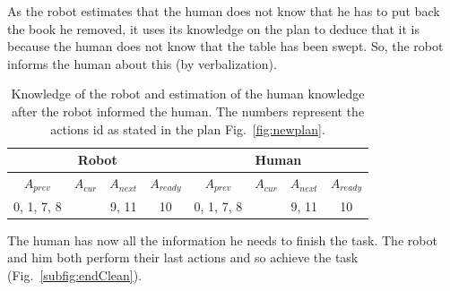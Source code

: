 \documentclass[english,a4paper,11pt,twoside]{StyleThese}
\begin{document}
As the robot estimates that the human does not know that he has to put back the book he removed, it uses its knowledge on the plan to deduce that it is because the human does not know that the table has been swept. So, the robot informs the human about this (by verbalization). 

\begin{table}[!h]
\begin{center}
\begin{tabular}{|c|c|c|c||c|c|c|c|}
\hline
\multicolumn{4}{|c||}{Robot} & \multicolumn{4}{c|}{Human}\\
\hline
$A_{prev}$ & $A_{cur}$ & $A_{next}$ & $A_{ready}$ & $A_{prev}$ & $A_{cur}$ & $A_{next}$ & $A_{ready}$\\
\hline
\hline
0, 1, 7, 8  &  & 9, 11 & 10 & 0, 1, 7, 8 &  & 9, 11 & 10\\
\hline
\end{tabular}
\end{center}
\caption{Knowledge of the robot and estimation of the human knowledge after the robot informed the human. The numbers represent the actions id as stated in the plan Fig.~\ref{fig:newplan}.}
\label{table:results}
\end{table}

The human has now all the information he needs to finish the task. The robot and him both perform their last actions and so achieve the task (Fig.~\ref{subfig:endClean}).
\end{document}
